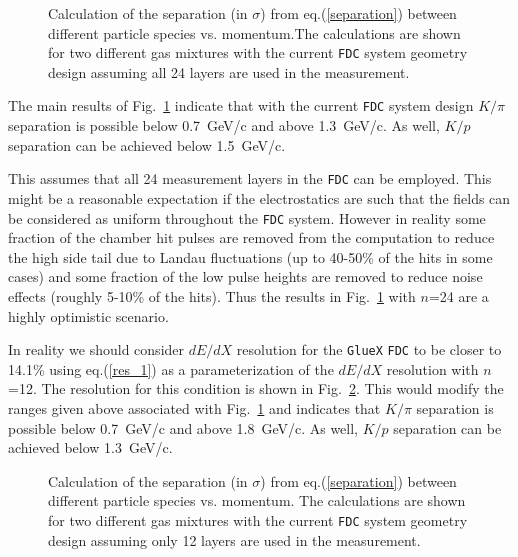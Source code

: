 \documentclass[12pt]{article}
\begin{document}
\begin{figure}[htbp]
\vspace{12.5cm}
\caption{\small{Calculation of the separation (in $\sigma$) from eq.(\ref{separation}) between different particle species vs. momentum.The calculations are shown for two different
 gas mixtures with the current {\tt FDC} system geometry design assuming all 24 layers are used in the measurement.}}
\label{resol}
\end{figure}

The main results of Fig.~\ref{resol} indicate that with the current {\tt FDC}
system design $K/\pi$ separation is possible below 0.7~GeV/c and above
1.3~GeV/c.  As well, $K/p$ separation can be achieved below 1.5~GeV/c.

This assumes that all 24 measurement layers in the {\tt FDC} can be employed.
This might be a reasonable expectation if the electrostatics are such that the 
fields can be considered as uniform throughout the {\tt FDC} system. However 
in reality some fraction of the chamber hit pulses are removed from the 
computation to reduce the high side tail due to Landau fluctuations (up to 
40-50\% of the hits in some cases) and some fraction of the low pulse heights 
are removed to reduce noise effects (roughly 5-10\% of the hits).  Thus the 
results in Fig.~\ref{resol} with $n$=24 are a highly optimistic scenario.

In reality we should consider $dE/dX$ resolution for the {\tt GlueX} {\tt FDC}
to be closer to 14.1\% using eq.(\ref{res_1}) as a parameterization of the 
$dE/dX$ resolution with $n$=12.  The resolution for this condition is shown in 
Fig.~\ref{resol_12}.  This would modify the ranges given above associated with 
Fig.~\ref{resol} and indicates that $K/\pi$ separation is possible below 
0.7~GeV/c and above 1.8~GeV/c. As well, $K/p$ separation can be achieved 
below 1.3~GeV/c.

\begin{figure}[htbp]
\vspace{13.5cm}
\caption{\small{Calculation of the separation (in $\sigma$) from 
eq.(\ref{separation}) between different particle species vs. momentum.
The calculations are shown for two different gas mixtures with the
current {\tt FDC} system geometry design assuming only 12 layers are used in
the measurement.}}
\label{resol_12}
\end{figure}
\end{document}
